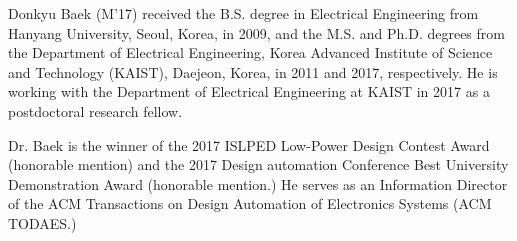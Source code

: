 \documentclass{IEEEtran}
\begin{document}




\begin{IEEEbiography}{Donkyu Baek}
(M'17) received the B.S. degree in Electrical Engineering from Hanyang University, Seoul, Korea, in 2009, and the M.S. and Ph.D. degrees from the Department of Electrical Engineering, Korea Advanced Institute of Science and Technology (KAIST), Daejeon, Korea, in 2011 and 2017, respectively. He is working with the Department of Electrical Engineering at KAIST in 2017 as a postdoctoral research fellow. 

Dr. Baek is the winner of the 2017 ISLPED Low-Power Design Contest Award (honorable mention) and the 2017 Design automation Conference Best University Demonstration Award (honorable mention.) He serves as an Information Director of the ACM Transactions on Design Automation of Electronics Systems (ACM TODAES.)
\end{IEEEbiography}

\end{document}
